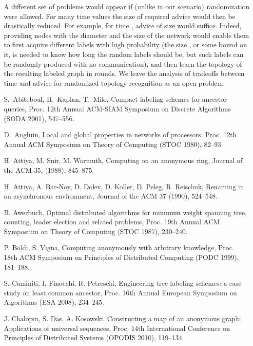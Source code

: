 \documentclass{article}
\begin{document}
A different set of problems would appear if (unlike in our scenario) randomization were allowed. For many time values the size of required advice
would then be drastically reduced. For example, for time , advice of size  would suffice. Indeed, providing nodes with
 the diameter  and the size  of the network would enable them to first acquire
different labels with high probability (the size , or some bound on it, is needed to know how long the random labels should be, but such labels can be
randomly produced with no communication),
and then learn the topology of the resulting labeled graph in  rounds. We leave the analysis of tradeoffs between time and advice for randomized topology 
recognition as an open problem.  
 

\begin{thebibliography}{99}


S.~Abiteboul, H.~Kaplan, T.~Milo, Compact labeling schemes for ancestor
queries, Proc. 12th Annual ACM-SIAM Symposium on Discrete
Algorithms (SODA 2001), 547--556.

D.~Angluin, Local and global properties in networks of processors. 
Proc. 12th Annual ACM Symposium on Theory of Computing (STOC 1980), 82--93.

H. Attiya, M. Snir, M. Warmuth,
Computing on an anonymous ring,
Journal of the ACM 35, (1988), 845--875.

H. Attiya, A. Bar-Noy, D. Dolev, D. Koller, D. Peleg, R. Reischuk,
Renaming in an asynchronous environment,  Journal of the ACM 37 (1990), 524--548.

B. Awerbuch, Optimal distributed algorithms for minimum weight spanning tree, 
counting, leader election and related problems,
Proc. 19th Annual ACM Symposium on Theory of Computing (STOC 1987), 230--240.


P. Boldi, S. Vigna,
Computing anonymously with arbitrary knowledge,
Proc. 18th ACM Symposium on Principles of Distributed Computing (PODC 1999), 181--188.

S. Caminiti, I. Finocchi, R. Petreschi,
Engineering tree labeling schemes: a case study on least common ancestor,
Proc. 16th Annual European Symposium on Algorithms (ESA 2008), 234--245.


J. Chalopin, S. Das, A. Kosowski, 
Constructing a map of an anonymous graph: Applications of universal sequences,
Proc. 14th International Conference on Principles of Distributed Systems (OPODIS 2010), 119--134.



\end{thebibliography}
\end{document}

